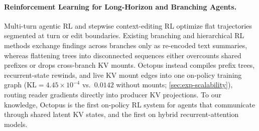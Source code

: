 \documentclass{article}
\begin{document}
\paragraph{Reinforcement Learning for Long-Horizon and Branching Agents.}
Multi-turn agentic RL \citep{jin2025searchr1, wang2025ragen, fu2025areal, zhang2026arealdta, wang2026qwengyre, sun2026multiagentopd} and stepwise context-editing RL \citep{wu2025resum, li2026sculptor, shao2026clm} optimize flat trajectories segmented at turn or edit boundaries. Existing branching and hierarchical RL methods \citep{pan2025apr, sun2025contextfolding, hong2025mgrpo} exchange findings across branches only as re-encoded text summaries, whereas flattening trees into disconnected sequences either overcounts shared prefixes or drops cross-branch KV mounts. Octopus instead compiles prefix trees, recurrent-state rewinds, and live KV mount edges into one on-policy training graph ($\mathrm{KL} = 4.45\times 10^{-4}$ vs.\ $0.0142$ without mounts; \cref{sec:exp-scalability}), routing reader gradients directly into producer KV projections. To our knowledge, Octopus is the first on-policy RL system for agents that communicate through shared latent KV states, and the first on hybrid recurrent-attention models.
\end{document}
